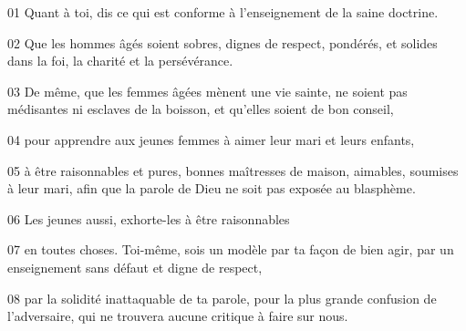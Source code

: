 01 Quant à toi, dis ce qui est conforme à l’enseignement de la saine doctrine.

02 Que les hommes âgés soient sobres, dignes de respect, pondérés, et solides dans la foi, la charité et la persévérance.

03 De même, que les femmes âgées mènent une vie sainte, ne soient pas médisantes ni esclaves de la boisson, et qu’elles soient de bon conseil,

04 pour apprendre aux jeunes femmes à aimer leur mari et leurs enfants,

05 à être raisonnables et pures, bonnes maîtresses de maison, aimables, soumises à leur mari, afin que la parole de Dieu ne soit pas exposée au blasphème.

06 Les jeunes aussi, exhorte-les à être raisonnables

07 en toutes choses. Toi-même, sois un modèle par ta façon de bien agir, par un enseignement sans défaut et digne de respect,

08 par la solidité inattaquable de ta parole, pour la plus grande confusion de l’adversaire, qui ne trouvera aucune critique à faire sur nous.